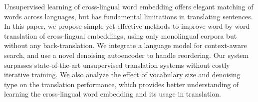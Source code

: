 Unsupervised learning of cross-lingual word embedding offers elegant matching of words across languages, but has fundamental limitations in translating sentences. In this paper, we propose simple yet effective methods to improve word-by-word translation of cross-lingual embeddings, using only monolingual corpora but without any back-translation. We integrate a language model for context-aware search, and use a novel denoising autoencoder to handle reordering. Our system surpasses state-of-the-art unsupervised translation systems without costly iterative training. We also analyze the effect of vocabulary size and denoising type on the translation performance, which provides better understanding of learning the cross-lingual word embedding and its usage in translation.
